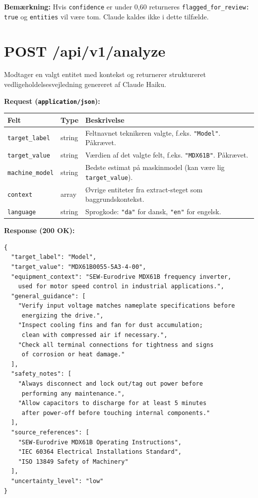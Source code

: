 \documentclass[12pt, a4paper, oneside]{report}
\begin{document}
\textbf{Bemærkning:} Hvis \texttt{confidence} er under 0{,}60 returneres
\texttt{flagged\_for\_review: true} og \texttt{entities} vil være tom.
Claude kaldes ikke i dette tilfælde.

\section*{POST /api/v1/analyze}

Modtager en valgt entitet med kontekst og returnerer struktureret
vedligeholdelsesvejledning genereret af Claude Haiku.

\textbf{Request (\texttt{application/json}):}

\begin{table}[H]
\centering
\begin{tabularx}{\textwidth}{llX}
\toprule
\textbf{Felt} & \textbf{Type} & \textbf{Beskrivelse} \\
\midrule
\texttt{target\_label} & string & Feltnavnet teknikeren valgte, f.eks. \texttt{"Model"}. Påkrævet. \\
\texttt{target\_value} & string & Værdien af det valgte felt, f.eks. \texttt{"MDX61B"}. Påkrævet. \\
\texttt{machine\_model} & string & Bedste estimat på maskinmodel (kan være lig \texttt{target\_value}). \\
\texttt{context}        & array  & Øvrige entiteter fra extract-steget som baggrundskontekst. \\
\texttt{language}       & string & Sprogkode: \texttt{"da"} for dansk, \texttt{"en"} for engelsk. \\
\bottomrule
\end{tabularx}
\end{table}

\textbf{Response (200 OK):}
\begin{lstlisting}[language={}]
{
  "target_label": "Model",
  "target_value": "MDX61B0055-5A3-4-00",
  "equipment_context": "SEW-Eurodrive MDX61B frequency inverter,
    used for motor speed control in industrial applications.",
  "general_guidance": [
    "Verify input voltage matches nameplate specifications before
     energizing the drive.",
    "Inspect cooling fins and fan for dust accumulation;
     clean with compressed air if necessary.",
    "Check all terminal connections for tightness and signs
     of corrosion or heat damage."
  ],
  "safety_notes": [
    "Always disconnect and lock out/tag out power before
     performing any maintenance.",
    "Allow capacitors to discharge for at least 5 minutes
     after power-off before touching internal components."
  ],
  "source_references": [
    "SEW-Eurodrive MDX61B Operating Instructions",
    "IEC 60364 Electrical Installations Standard",
    "ISO 13849 Safety of Machinery"
  ],
  "uncertainty_level": "low"
}
\end{lstlisting}
\end{document}
